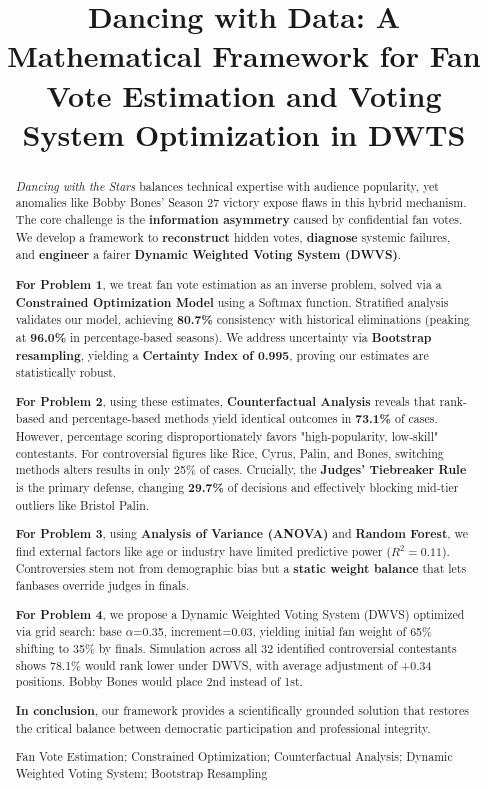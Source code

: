 \documentclass{mcmthesis}
\title{Dancing with Data: A Mathematical Framework for Fan Vote Estimation and Voting System Optimization in DWTS}
\begin{document}
\begin{abstract}
\setlength{\parindent}{1.5em}
\indent 

\textit{Dancing with the Stars} balances technical expertise with audience popularity, yet anomalies like Bobby Bones’ Season 27 victory expose flaws in this hybrid mechanism. The core challenge is the \textbf{information asymmetry} caused by confidential fan votes. We develop a framework to \textbf{reconstruct} hidden votes, \textbf{diagnose} systemic failures, and \textbf{engineer} a fairer \textbf{Dynamic Weighted Voting System (DWVS)}.

\textbf{For Problem 1}, we treat fan vote estimation as an inverse problem, solved via a \textbf{Constrained Optimization Model} using a Softmax function. Stratified analysis validates our model, achieving \textbf{80.7\%} consistency with historical eliminations (peaking at \textbf{96.0\%} in percentage-based seasons). We address uncertainty via \textbf{Bootstrap resampling}, yielding a \textbf{Certainty Index of 0.995}, proving our estimates are statistically robust.

\textbf{For Problem 2}, using these estimates, \textbf{Counterfactual Analysis} reveals that rank-based and percentage-based methods yield identical outcomes in \textbf{73.1\%} of cases. However, percentage scoring disproportionately favors "high-popularity, low-skill" contestants. For controversial figures like Rice, Cyrus, Palin, and Bones, switching methods alters results in only 25\% of cases. Crucially, the \textbf{Judges’ Tiebreaker Rule} is the primary defense, changing \textbf{29.7\%} of decisions and effectively blocking mid-tier outliers like Bristol Palin.

\textbf{For Problem 3}, using \textbf{Analysis of Variance (ANOVA)} and \textbf{Random Forest}, we find external factors like age or industry have limited predictive power ($R^2=0.11$). Controversies stem not from demographic bias but a \textbf{static weight balance} that lets fanbases override judges in finals.

\textbf{For Problem 4}, we propose a Dynamic Weighted Voting System (DWVS) optimized via grid search: base $\alpha$=0.35, increment=0.03, yielding initial fan weight of 65\% shifting to 35\% by finals. Simulation across all 32 identified controversial contestants shows 78.1\% would rank lower under DWVS, with average adjustment of +0.34 positions. Bobby Bones would place 2nd instead of 1st.

\textbf{In conclusion}, our framework provides a scientifically grounded solution that restores the critical balance between democratic participation and professional integrity.


\begin{keywords}
Fan Vote Estimation; Constrained Optimization; Counterfactual Analysis; 
Dynamic Weighted Voting System; Bootstrap Resampling
\end{keywords}
\end{abstract}
\end{document}
